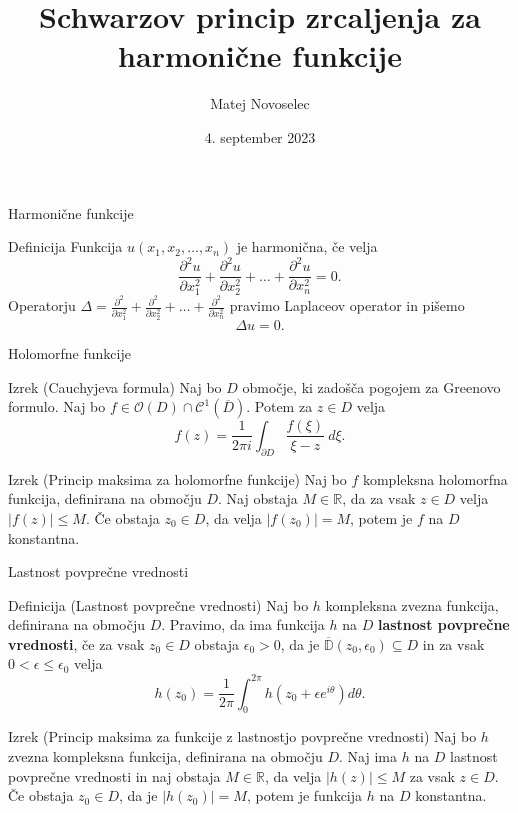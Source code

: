\documentclass{beamer}
\title{Schwarzov princip zrcaljenja za harmonične funkcije}
\author{Matej Novoselec}
\institute[UL FMF]{FMF Fakulteta za matematiko in fiziko}
\date{4. september 2023}
\theoremstyle{definition}
\theoremstyle{definition}
\begin{document}
\begin{frame}
   \titlepage
\end{frame}
\begin{frame}{Harmonične funkcije}
    \begin{block}{Definicija}
     Funkcija $u(x_1, x_2, \dots, x_n)$ je harmonična, če velja
     $$
     \frac{\partial^2 u}{\partial x_1 ^ 2} +  \frac{\partial^2 u}{\partial x_2 ^ 2} + \dots + \frac{\partial^2 u}{\partial x_n ^ 2} = 0.
     $$
     Operatorju $\Delta  = \frac{\partial^2}{\partial x_1 ^ 2} +  \frac{\partial^2}{\partial x_2 ^ 2} + \dots + \frac{\partial^2}{\partial x_n ^ 2}$ pravimo Laplaceov operator in pišemo
     $$
     \Delta u = 0.
     $$
    \end{block}
 \end{frame}

\begin{frame}{Holomorfne funkcije}
   \begin{alertblock}{Izrek (Cauchyjeva formula)}
    Naj bo $D$ območje, ki zadošča pogojem za Greenovo formulo. 
    Naj bo $f \in \mathcal{O}(D) \cap \mathcal{C}^1(\overline{D})$. 
    Potem za $z \in D$ velja 
    $$
    f(z) = \frac{1}{2 \pi i} \int_{\partial D}{\frac{f(\xi)}{\xi - z}~d\xi}.
    $$
   \end{alertblock}
   \pause
    \begin{alertblock}{Izrek (Princip maksima za holomorfne funkcije)}
        Naj bo $f$ kompleksna holomorfna funkcija, definirana na območju $D$. 
        Naj obstaja $M \in \mathbb{R}$, da za vsak $z \in D$ velja $|f(z)| \leq M $. 
        Če obstaja $z_0 \in D$, da velja $|f(z_0)| = M$, potem je $f$ na $D$ konstantna.  
   \end{alertblock}
\end{frame}
\begin{frame}{Lastnost povprečne vrednosti}
    \begin{block}{Definicija (Lastnost povprečne vrednosti)}
        Naj bo $h$ kompleksna zvezna funkcija, definirana na območju $D$. Pravimo, da ima funkcija $h$ na $D$ \textbf{lastnost povprečne vrednosti}, če za vsak $z_0 \in D$ obstaja $\epsilon_0 > 0$, da je $\overline{\mathbb{D}}(z_0, \epsilon_0) \subseteq D$ in za vsak $0 < \epsilon \leq \epsilon_0 $ velja
        $$
            h(z_0) = \frac{1}{2 \pi} \int_{0}^{2 \pi}{h(z_0 + \epsilon e^{i \theta}) d\theta}.
        $$
    \end{block}
    \pause
     \begin{alertblock}{Izrek (Princip maksima za funkcije z lastnostjo povprečne vrednosti)}
        Naj bo $h$ zvezna kompleksna funkcija, definirana na območju $D$. Naj ima $h$ na $D$ lastnost povprečne vrednosti in naj obstaja $M \in \mathbb{R}$, da velja $|h(z)| \leq M$ za vsak $z \in D$. 
        Če obstaja $z_0 \in D$, da je $|h(z_0)| = M$, potem je funkcija $h$ na $D$ konstantna. 
    \end{alertblock}
 \end{frame}
\end{document}
